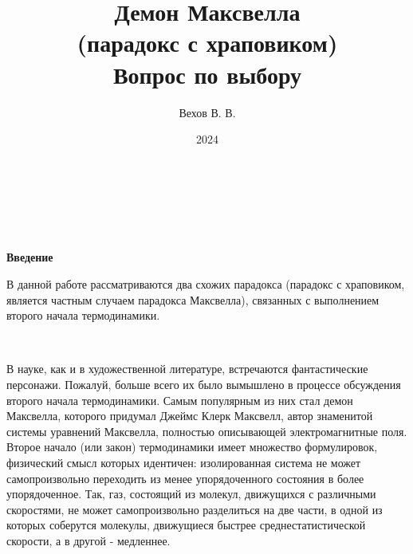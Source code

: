 \documentclass[a4paper, 12pt]{article}
\author{Вехов В. В.}
\title{Демон Максвелла\\ (парадокс с храповиком)\\ Вопрос по выбору}
\date{2024}
\begin{document}
\maketitle

\\\
\\\
\newpage

\vspace {20 mm}
\textbf{Введение}

В данной работе рассматриваются два схожих парадокса (парадокс с храповиком, является частным случаем парадокса Максвелла), связанных с выполнением второго начала термодинамики.


\newline\

В науке, как и в художественной литературе, встречаются фантастические персонажи. Пожалуй, больше всего их было вымышлено в процессе обсуждения второго начала термодинамики. Самым популярным из них стал демон Максвелла, которого придумал Джеймс Клерк Максвелл, автор знаменитой системы уравнений Максвелла, полностью описывающей электромагнитные поля. Второе начало (или закон) термодинамики имеет множество формулировок, физический смысл которых идентичен: изолированная система не может самопроизвольно переходить из менее упорядоченного состояния в более упорядоченное. Так, газ, состоящий из молекул, движущихся с различными скоростями, не может самопроизвольно разделиться на две части, в одной из которых соберутся молекулы, движущиеся быстрее среднестатистической скорости, а в другой - медленнее.\\
\end{document}

